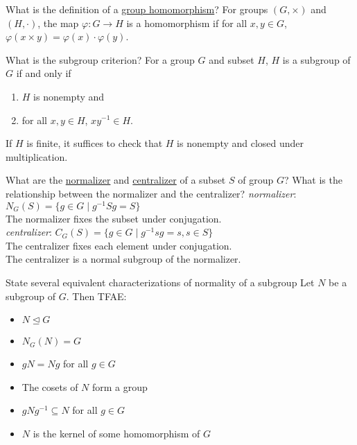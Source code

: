 \documentclass[avery5371,grid]{flashcards}
\newcommand{\inv}{^{-1}}
\let \phi \varphi
\begin{document}
\begin{flashcard}[Groups]{What is the definition of a \underline{group homomorphism}?}
 For groups $(G, \times)$ and $(H, \cdot)$, the map $\phi: G \to H$ is a homomorphism if for all $x,y \in G$, $\phi(x \times y) = \phi(x) \cdot \phi(y)$.
\end{flashcard}

\begin{flashcard}[Groups]{What is the subgroup criterion?}
 For a group $G$ and subset $H$, $H$ is a subgroup of $G$ if and only if
 \begin{enumerate}
      \item $H$ is nonempty and
      \item for all $x,y \in H$, $x y \inv \in H$.
 \end{enumerate}
If $H$ is finite, it suffices to check that $H$ is nonempty and closed under multiplication.
\end{flashcard}

\begin{flashcard}[Groups]{What are the \underline{normalizer} and \underline{centralizer} of a subset $S$ of group $G$? What is the relationship between the normalizer and the centralizer?}
 \emph{normalizer}: $N_G(S) = \{g \in G \mid g \inv S g = S \}$ \\
 The normalizer fixes the subset under conjugation.\\
 
 \emph{centralizer}: $C_G(S) = \{g \in G \mid g \inv s g = s, s \in S \}$\\
 The centralizer fixes each element under conjugation.\\
 
 The centralizer is a normal subgroup of the normalizer.
\end{flashcard}

\begin{flashcard}[Groups]{State several equivalent characterizations of normality of a subgroup}
 Let $N$ be a subgroup of $G$. Then TFAE:
 \begin{itemize}
      \item $N \trianglelefteq G$
      \item $N_G(N) = G$
      \item $gN = Ng$ for all $g \in G$
      \item The cosets of $N$ form a group
      \item $gNg \inv \subseteq N$ for all $g \in G$
      \item $N$ is the kernel of some homomorphism of $G$
 \end{itemize}
\end{flashcard}
\end{document}
